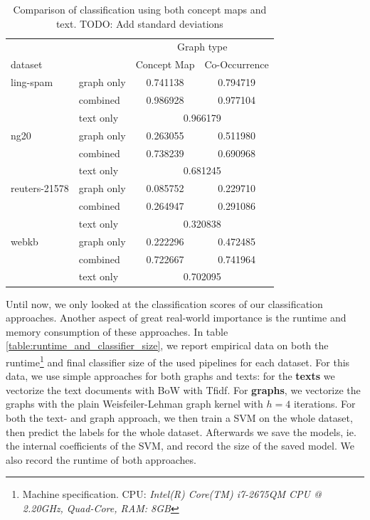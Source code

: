 

\begin{table}[htb!]
\centering
\begin{tabular}{llcc}
  &  & \multicolumn{2}{c}{Graph type} \\
   dataset   & &  Concept Map &  Co-Occurrence \\
\midrule
ling-spam 
          & graph only &  0.741138 &  0.794719\\
          & combined &  0.986928 &  0.977104\\
          & text only & \multicolumn{2}{c}{ 0.966179 }\\
\midrule
ng20 
          & graph only &  0.263055 &  0.511980\\
          & combined &  0.738239 &  0.690968\\
          & text only & \multicolumn{2}{c}{ 0.681245 }\\
\midrule
reuters-21578 
          & graph only &  0.085752 &  0.229710\\
          & combined &  0.264947 &  0.291086\\
          & text only & \multicolumn{2}{c}{ 0.320838 }\\
\midrule
webkb 
          & graph only &  0.222296 &  0.472485\\
          & combined &  0.722667 &  0.741964\\
          & text only & \multicolumn{2}{c}{ 0.702095 }\\	
\bottomrule
\end{tabular}
\caption[Results: Combined text- and graph features]{Comparison of classification using both concept maps and text. TODO: Add standard deviations}%
\label{table:results_comparison_combined}
\end{table}


Until now, we only looked at the classification scores of our classification approaches.
Another aspect of great real-world importance is the runtime and memory consumption of these approaches.
In table \ref{table:runtime_and_classifier_size}, we report empirical data on both the runtime\footnote{Machine specification. CPU: \textit{Intel(R) Core(TM) i7-2675QM CPU @ 2.20GHz, Quad-Core, RAM: \textit{8GB}}} and final classifier size of the used pipelines for each dataset.
For this data, we use simple approaches for both graphs and texts: for the \textbf{texts} we vectorize the text documents with BoW with Tfidf.
For \textbf{graphs}, we vectorize the graphs with the plain Weisfeiler-Lehman graph kernel with $h = 4$ iterations.
For both the text- and graph approach, we then train a SVM on the whole dataset, then predict the labels for the whole dataset. Afterwards we save the models, ie. the internal coefficients of the SVM, and record the size of the saved model.
We also record the runtime of both approaches.

